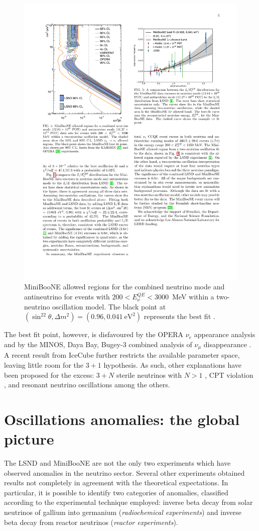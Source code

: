 \begin{figure}[htbp]
    \centering
    \includegraphics[width=0.7\linewidth]{figures/miniboone_bestfit.pdf}
    \caption{MiniBooNE allowed regions for the combined neutrino mode and antineutrino for events with $200<E_{\nu}^{QE}<3000$~MeV within a two-neutrino oscillation model. The black point at $( \sin^22\theta, \Delta m^2)=(0.96, 0.041~\mathrm{eV^2})$ represents the best fit \cite{Aguilar-Arevalo:2018gpe}.}
    \label{fig:miniboone_bestfit}
\end{figure}

The best fit point, however, is disfavoured by the OPERA $\nu_{e}$ appearance analysis \cite{Agafonova:2018dkb} and by the MINOS, Daya Bay, Bugey-3 combined analysis of $\nu_{\mu}$ disappearance \cite{Adamson:2016jku}. A recent result from IceCube \cite{TheIceCube:2016oqi} further restricts the available parameter space, leaving little room for the $3+1$ hypothesis. As such, other explanations have been proposed for the excess: $3+N$ sterile neutrinos with $N>1$ \cite{Conrad:2012qt}, CPT violation \cite{Kostelecky:2011gq}, and resonant neutrino oscillations \cite{Asaadi:2017bhx} among the others.


\section{Oscillations anomalies: the global picture}
The LSND and MiniBooNE are not the only two experiments which have observed anomalies in the neutrino sector. Several other experiments obtained results not completely in agreement with the theoretical expectations. In particular, it is possible to identify two categories of anomalies, classified according to the experimental technique employed: inverse beta decay from solar neutrinos of gallium into germanium (\emph{radiochemical experiments}) and inverse beta decay from reactor neutrinos (\emph{reactor experiments}).

